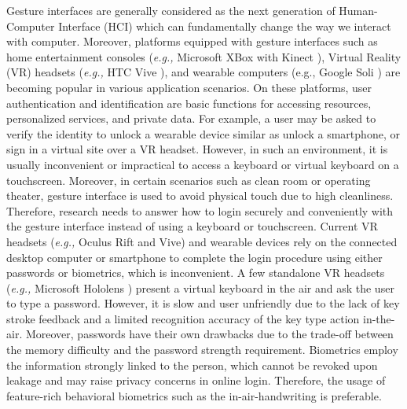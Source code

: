 \documentclass[conference]{IEEEtran}
\begin{document}
Gesture interfaces are generally considered as the next generation of Human-Computer Interface (HCI) which can fundamentally change the way we interact with computer. Moreover, platforms equipped with gesture interfaces such as home entertainment consoles (\textit{e.g.,} Microsoft XBox with Kinect \cite{Kinect}), Virtual Reality (VR) headsets (\textit{e.g.,} HTC Vive \cite{HTCVive}), and wearable computers (e.g., Google Soli \cite{Soli}) are becoming popular in various application scenarios. On these platforms, user authentication and identification are basic functions for accessing resources, personalized services, and private data. For example, a user may be asked to verify the identity to unlock a wearable device similar as unlock a smartphone, or sign in a virtual site over a VR headset. However, in such an environment, it is usually inconvenient or impractical to access a keyboard or virtual keyboard on a touchscreen. Moreover, in certain scenarios such as clean room or operating theater, gesture interface is used to avoid physical touch due to high cleanliness. Therefore, research needs to answer how to login securely and conveniently with the gesture interface instead of using a keyboard or touchscreen. Current VR headsets (\textit{e.g.,} Oculus Rift and Vive) and wearable devices rely on the connected desktop computer or smartphone to complete the login procedure using either passwords or biometrics, which is inconvenient. A few standalone VR headsets (\textit{e.g.,} Microsoft Hololens \cite{HoloLens}) present a virtual keyboard in the air and ask the user to type a password. However, it is slow and user unfriendly due to the lack of key stroke feedback and a limited recognition accuracy of the key type action in-the-air. Moreover, passwords have their own drawbacks due to the trade-off between the memory difficulty and the password strength requirement. Biometrics employ the information strongly linked to the person, which cannot be revoked upon leakage and may raise privacy concerns in online login. Therefore, the usage of feature-rich behavioral biometrics such as the in-air-handwriting is preferable.
\end{document}
